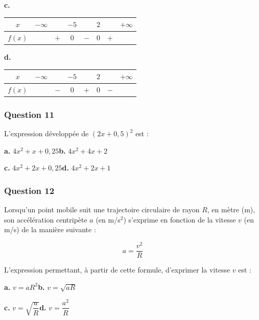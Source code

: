 \textbf{c.} 
\begin{tabular}{|c|ccccccc|}
\hline
$x$ & $-\infty$ & & $-5$ & & $2$ & & $+\infty$ \\
\hline
$f(x)$ & & $+$ & $0$ & $-$ & $0$ & $+$ &\\
\hline
\end{tabular}
\hfill 
\textbf{d.} 
\begin{tabular}{|c|ccccccc|}
\hline
$x$ & $-\infty$ & & $-5$ & & $2$ & & $+\infty$ \\
\hline
$f(x)$ & & $-$ & $0$ & $+$ & $0$ & $-$ &\\
\hline
\end{tabular}

\subsubsection*{Question 11}
L'expression développée de $(2x + 0,5)^2$ est :

\textbf{a.} $4x^2 + x + 0,25$\hfill \textbf{b.} $4x^2 + 4x + 2$

\textbf{c.} $4x^2 + 2x + 0,25$\hfill \textbf{d.} $4x^2 + 2x + 1$

\subsubsection*{Question 12}
Lorsqu'un point mobile suit une trajectoire circulaire de rayon $R$, en mètre (m), son accélération centripète $a$ (en m/s$^2$) s'exprime en fonction de la vitesse $v$ (en m/s) de la manière suivante :

\[a = \dfrac{v^2}{R}\]

L'expression permettant, à partir de cette formule, d'exprimer la vitesse $v$ est :

\textbf{a.} $v = aR^2$\hfill \textbf{b.} $v = \sqrt{aR}$

\textbf{c.} $v = \sqrt{\dfrac{a}{R}}$\hfill \textbf{d.} $v = \dfrac{a^2}{R}$

